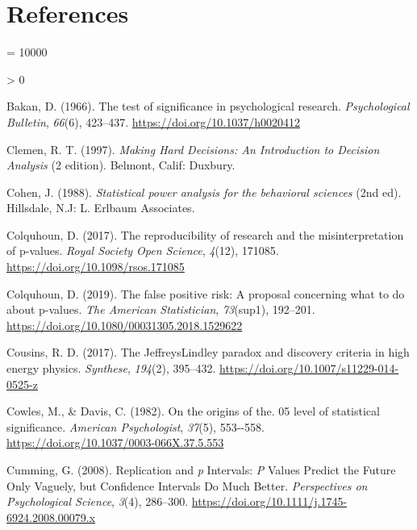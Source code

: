 \documentclass[
  english,
  ,man, a4paper,floatsintext]{apa6}
\newlength{\cslhangindent}
\newenvironment{CSLReferences}[2] %
 {%
  \setlength{\parindent}{0pt}
  \ifodd #1 \everypar{\setlength{\hangindent}{\cslhangindent}}\ignorespaces\fi
  \ifnum #2 > 0
  \setlength{\parskip}{#2\baselineskip}
  \fi
 }%
 {}
\begin{document}
\newpage

\hypertarget{references}{%
\section{References}\label{references}}

\begingroup

\interlinepenalty = 10000

\hypertarget{refs}{}
\begin{CSLReferences}{1}{0}
\leavevmode\hypertarget{ref-bakan_test_1966}{}%
Bakan, D. (1966). The test of significance in psychological research. \emph{Psychological Bulletin}, \emph{66}(6), 423--437. \url{https://doi.org/10.1037/h0020412}

\leavevmode\hypertarget{ref-clemen_making_1997}{}%
Clemen, R. T. (1997). \emph{Making {Hard} {Decisions}: {An} {Introduction} to {Decision} {Analysis}} (2 edition). Belmont, Calif: Duxbury.

\leavevmode\hypertarget{ref-cohen_statistical_1988}{}%
Cohen, J. (1988). \emph{Statistical power analysis for the behavioral sciences} (2nd ed). {Hillsdale, N.J}: {L. Erlbaum Associates}.

\leavevmode\hypertarget{ref-colquhoun_reproducibility_2017}{}%
Colquhoun, D. (2017). The reproducibility of research and the misinterpretation of p-values. \emph{Royal Society Open Science}, \emph{4}(12), 171085. \url{https://doi.org/10.1098/rsos.171085}

\leavevmode\hypertarget{ref-colquhoun_false_2019}{}%
Colquhoun, D. (2019). The false positive risk: A proposal concerning what to do about p-values. \emph{The American Statistician}, \emph{73}(sup1), 192--201. \url{https://doi.org/10.1080/00031305.2018.1529622}

\leavevmode\hypertarget{ref-cousins_jeffreyslindley_2017}{}%
Cousins, R. D. (2017). The {Jeffreys}{{Lindley}} paradox and discovery criteria in high energy physics. \emph{Synthese}, \emph{194}(2), 395--432. \url{https://doi.org/10.1007/s11229-014-0525-z}

\leavevmode\hypertarget{ref-cowles_origins_1982}{}%
Cowles, M., \& Davis, C. (1982). On the origins of the. 05 level of statistical significance. \emph{American Psychologist}, \emph{37}(5), 553-\/-558. \url{https://doi.org/10.1037/0003-066X.37.5.553}

\leavevmode\hypertarget{ref-cumming_replication_2008}{}%
Cumming, G. (2008). Replication and {\emph{p}} {Intervals}: {\emph{P}} {Values Predict} the {Future Only Vaguely}, but {Confidence Intervals Do Much Better}. \emph{Perspectives on Psychological Science}, \emph{3}(4), 286--300. \url{https://doi.org/10.1111/j.1745-6924.2008.00079.x}


\end{CSLReferences}
\end{document}
